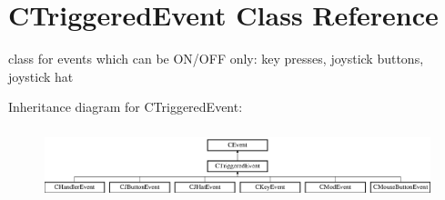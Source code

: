 \hypertarget{classCTriggeredEvent}{\section{C\-Triggered\-Event Class Reference}
\label{classCTriggeredEvent}
}


class for events which can be O\-N/\-O\-F\-F only\-: key presses, joystick buttons, joystick hat  


Inheritance diagram for C\-Triggered\-Event\-:\begin{figure}[H]
\begin{center}
\leavevmode
\includegraphics[height=2.089552cm]{classCTriggeredEvent}
\end{center}
\end{figure}
